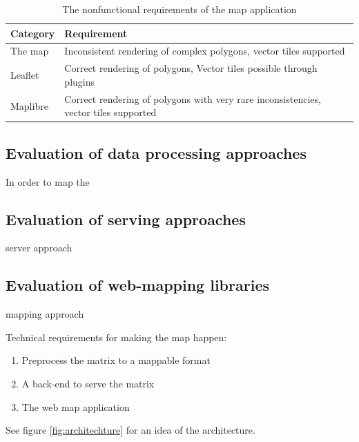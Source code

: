 \begin{table}[h]
	\centering
	\begin{tabular}{ | L{0.3\textwidth} | L{0.6\textwidth} | }
		\hline
		Category
		& Requirement
		\\
		\hline
		\hline
		The map
		& Inconsistent rendering of complex polygons, vector tiles supported
		\\
		\hline
		Leaflet
		& Correct rendering of polygons, Vector tiles possible through plugins
		\\
		\hline
		Maplibre
		& Correct rendering of polygons with very rare inconsistencies, vector tiles supported
		\\
		\hline
	\end{tabular}
	\caption{The nonfunctional requirements of the map application}
	\label{tab:nonfunctional requirements}
\end{table}



\subsection{Evaluation of data processing approaches}
In order to map the 


\subsection{Evaluation of serving approaches}
server approach

\subsection{Evaluation of web-mapping libraries}
mapping approach

Technical requirements for making the map happen:
\begin{enumerate}
	\item Preprocess the matrix to a mappable format
	\item A back-end to serve the matrix
	\item The web map application
\end{enumerate}

See figure \ref{fig:architechture} for an idea of the architecture.

